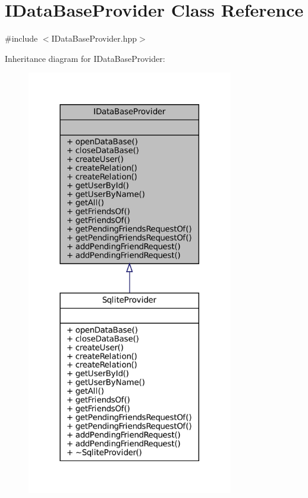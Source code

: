 \hypertarget{classIDataBaseProvider}{}\section{I\+Data\+Base\+Provider Class Reference}
\label{classIDataBaseProvider}


{\ttfamily \#include $<$I\+Data\+Base\+Provider.\+hpp$>$}



Inheritance diagram for I\+Data\+Base\+Provider\+:
\nopagebreak
\begin{figure}[H]
\begin{center}
\leavevmode
\includegraphics[width=255pt]{classIDataBaseProvider__inherit__graph}
\end{center}
\end{figure}


